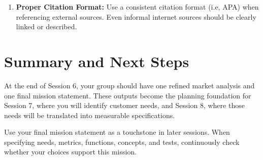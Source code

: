 \begin{enumerate}
\begin{itemize}
\item Analyzing the competitive landscape and how it influences your product planning decisions.
\item Exploring relevant industry trends and how they might impact your product's success.
\item Justifying your chosen target price point based on market research or competitor analysis.
\item Explaining the rationale behind prioritizing certain stakeholders over others.
\end{itemize}
\item \textbf{Proper Citation Format:} Use a consistent citation format (i.e, APA) when referencing external sources. Even informal internet sources should be clearly linked or described.
\end{enumerate}

\section{Summary and Next Steps}

At the end of Session 6, your group should have one refined market analysis and one final mission statement. These outputs become the planning foundation for Session 7, where you will identify customer needs, and Session 8, where those needs will be translated into measurable specifications.

\begin{tcolorbox}[title=Hint]
Use your final mission statement as a touchstone in later sessions. When specifying needs, metrics, functions, concepts, and tests, continuously check whether your choices support this mission.
\end{tcolorbox}
